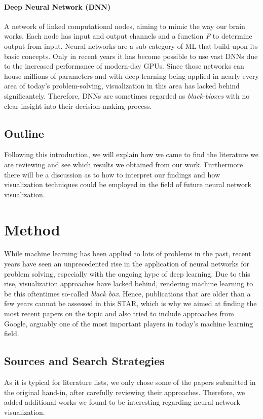 \documentclass{acmsiggraph}               %
\begin{document}
\paragraph{Deep Neural Network (DNN)}
A network of linked computational nodes, aiming to mimic the way our brain works. Each node has input and output channels and a function \textit{F} to determine output from input. Neural networks are a sub-category of ML that build upon its basic concepts. Only in recent years it has become possible to use vast DNNs due to the increased performance of modern-day GPUs. Since those networks can house millions of parameters and with deep learning being applied in nearly every area of today's problem-solving, visualization in this area has lacked behind significantely. Therefore, DNNs are sometimes regarded as \textit{black-bloxes} with no clear insight into their decision-making process.

\subsection{Outline}
Following this introduction, we will explain how we came to find the literature we are reviewing and see which results we obtained from our work. Furthermore there will be a discussion as to how to interpret our findings and how visualization techniques could be employed in the field of future neural network visualization.

\section{Method}
While machine learning has been applied to lots of problems in the past, recent years have seen an unprecedented rise in the application of neural networks for problem solving, especially with the ongoing hype of deep learning. Due to this rise, visualization approaches have lacked behind, rendering machine learning to be this oftentimes so-called \textit{black box}. Hence, publications that are older than a few years cannot be assessed in this STAR, which is why we aimed at finding the most recent papers on the topic and also tried to include approaches from Google, arguably one of the most important players in today's machine learning field.

\subsection{Sources and Search Strategies}
As it is typical for literature lists, we only chose some of the papers submitted in the original hand-in, after carefully reviewing their approaches. Therefore, we added additional works we found to be interesting regarding neural network visualization.
\end{document}
